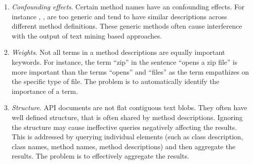 \begin{enumerate}
		
	\item \textit{Confounding effects}. Certain method names have an confounding effects. For instance , ,  are too generic and tend to have similar descriptions across different method definitions. These generic methods often cause interference with the output of text mining based approaches.
	
	\item \textit{Weights}. Not all terms in a method descriptions are equally important keywords. For instance, the term ``zip'' in the sentence ``opens a zip file'' is more important than the terms ``opens'' and ``files'' as the term empathizes on the specific type of file. The problem is to automatically identify the importance of a term.
	
	\item \textit{Structure}. API documents are not flat contiguous text blobs. They often have well defined structure, that is often shared by method descriptions. Ignoring the structure may cause ineffective queries negatively affecting the results. This is addressed by querying individual elements (such as class description, class names, method names, method descriptions) and then aggregate the results. The problem is to effectively aggregate the results.
			
	
\end{enumerate}
